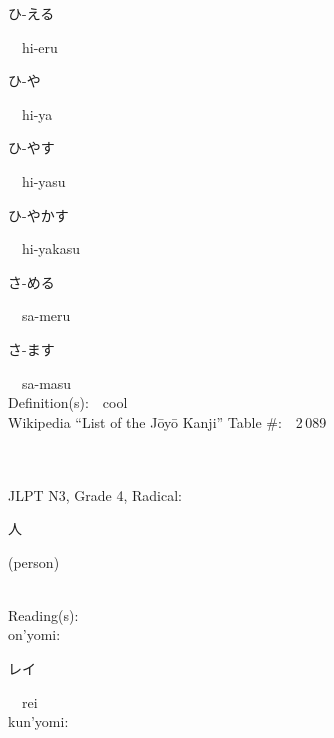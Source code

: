 \begin{multicols}{2}
{\hspace*{2em}}{\begin{CJK}{UTF8}{min} ひ-える \end{CJK}}\ \ hi-eru\ \ \\
{\hspace*{2em}}{\begin{CJK}{UTF8}{min} ひ-や \end{CJK}}\ \ hi-ya\ \ \\
{\hspace*{2em}}{\begin{CJK}{UTF8}{min} ひ-やす \end{CJK}}\ \ hi-yasu\ \ \\
{\hspace*{2em}}{\begin{CJK}{UTF8}{min} ひ-やかす \end{CJK}}\ \ hi-yakasu\ \ \\
{\hspace*{2em}}{\begin{CJK}{UTF8}{min} さ-める \end{CJK}}\ \ sa-meru\ \ \\
{\hspace*{2em}}{\begin{CJK}{UTF8}{min} さ-ます \end{CJK}}\ \ sa-masu\ \ \\
Definition(s):\ \ cool \\
Wikipedia ``List of the J\=oy\=o Kanji'' Table \#:\ \ 2\,089 \\
\ \ \\
{\fontsize{34pt}{40pt}  }\ \ \\  %
{JLPT N3, Grade 4, Radical:\ \ {\begin{CJK}{UTF8}{min} 人 \end{CJK}} (person) } \\
Reading(s):\ \ \\
{\hspace*{1em}}on'yomi:\ \ \\
{\hspace*{2em}}{\begin{CJK}{UTF8}{min} レイ \end{CJK}}\ \ rei\ \ \\
{\hspace*{1em}}kun'yomi:\ \ \\

\end{multicols}
